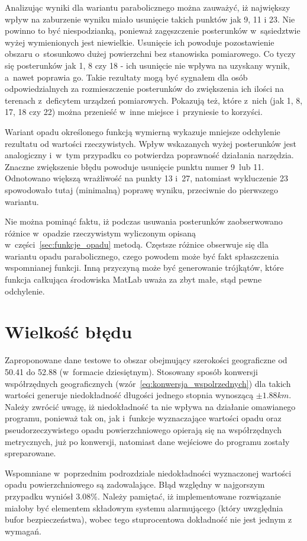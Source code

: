 Analizując wyniki dla wariantu parabolicznego można zauważyć, iż największy wpływ na zaburzenie wyniku miało usunięcie takich punktów jak 9, 11 i 23. Nie powinno to być niespodzianką, ponieważ zagęszczenie posterunków w~sąsiedztwie wyżej wymienionych jest niewielkie. Usunięcie ich powoduje pozostawienie obszaru o~stosunkowo dużej powierzchni bez stanowiska pomiarowego. Co tyczy się posterunków jak 1, 8 czy 18 - ich usunięcie nie wpływa na uzyskany wynik, a~nawet poprawia go. Takie rezultaty mogą być sygnałem dla osób odpowiedzialnych za rozmieszczenie posterunków do zwiększenia ich ilości na terenach z~deficytem urządzeń pomiarowych. Pokazują też, które z~nich (jak 1, 8, 17, 18 czy 22) można przenieść w~inne miejsce i~przyniesie to korzyści.


Wariant opadu określonego funkcją wymierną wykazuje mniejsze odchylenie rezultatu od wartości rzeczywistych. Wpływ wskazanych wyżej posterunków jest analogiczny i~w~tym przypadku co potwierdza poprawność działania narzędzia. Znaczne zwiększenie błędu powoduje usunięcie punktu numer 9~lub 11. Odnotowano większą wrażliwość na punkty 13 i~27, natomiast wykluczenie 23 spowodowało tutaj (minimalną) poprawę wyniku, przeciwnie do pierwszego wariantu.

Nie można pominąć faktu, iż podczas usuwania posterunków zaobserwowano różnice w~opadzie rzeczywistym wyliczonym opisaną w~części~\ref{sec:funkcje_opadu} metodą. Częstsze różnice obserwuje się dla wariantu opadu parabolicznego, czego powodem może być fakt spłaszczenia wspomnianej funkcji. Inną przyczyną może być generowanie trójkątów, które funkcja całkująca środowiska MatLab uważa za zbyt małe, stąd pewne odchylenie.

\section{Wielkość błędu}
Zaproponowane dane testowe to obszar obejmujący szerokości geograficzne od 50.41 do 52.88 (w~formacie dziesiętnym). Stosowany sposób konwersji współrzędnych geograficznych (wzór~\ref{eq:konwersja_wspolrzednych}) dla takich wartości generuje niedokładność długości jednego stopnia wynoszącą $\pm 1.88 km$. Należy zwrócić uwagę, iż niedokładność ta nie wpływa na działanie omawianego programu, ponieważ tak on, jak i~funkcje wyznaczające wartości opadu oraz pseudorzeczywistego opadu powierzchniowego opierają się na współrzędnych metrycznych, już po konwersji, natomiast dane wejściowe do programu zostały spreparowane.  

Wspomniane w~poprzednim podrozdziale niedokładności wyznaczonej wartości opadu powierzchniowego są zadowalające. Błąd względny w najgorszym przypadku wyniósł 3.08\%. Należy pamiętać, iż implementowane rozwiązanie miałoby być elementem składowym systemu alarmującego (który uwzględnia bufor bezpieczeństwa), wobec tego stuprocentowa dokładność nie jest jednym z wymagań.